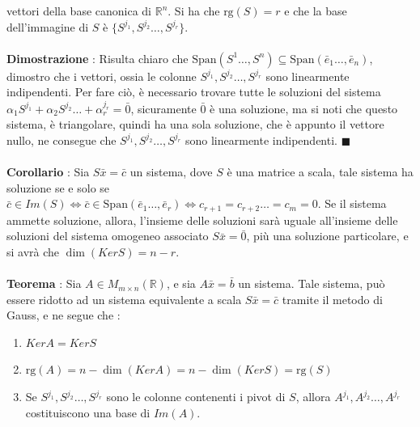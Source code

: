 \documentclass[12pt, letterpaper]{article}
\newcommand{\R}{{\mathbb R}}
\newcommand{\rg}{{\text{rg}}}
\newcommand{\acc}{\\\hphantom{}\\}
\newcommand{\Span}{{\text{Span}}}
\begin{document}
vettori della base canonica di \(\R^n\). Si ha che \(\rg(S)=r\) e che la base dell'immagine di \(S\) è \(\{S^{j_1},S^{j_2}\dots,S^{j_r}\}\).\acc 
\textbf{Dimostrazione} : Risulta chiaro che \(\Span(S^1\dots,S^n)\subseteq \Span(\bar e_1\dots,\bar e_n)\), dimostro che 
i vettori, ossia le colonne \(S^{j_1},S^{j_2}\dots,S^{j_r}\) sono linearmente indipendenti. Per fare ciò, è necessario trovare tutte 
le soluzioni del sistema  \(\alpha_1S^{j_1}+\alpha_2S^{j_2}\dots+\alpha_r^{j_r}=\bar 0\), sicuramente \(\bar 0\) è una soluzione, 
ma si noti che questo sistema, è triangolare, quindi ha una sola soluzione, che è appunto il vettore nullo, ne consegue che 
\(S^{j_1},S^{j_2}\dots,S^{j_r}\) sono linearmente indipendenti. \(\blacksquare\)\acc 
\textbf{Corollario} : Sia \(S\bar x=\bar c\) un sistema, dove \(S\) è una matrice a scala, tale sistema ha soluzione 
se e solo se \(\bar c \in Im(S)\iff \bar c \in \Span(\bar e_1\dots,\bar e_r)\iff c_{r+1}=c_{r+2}\dots = c_m=0\).
Se il sistema ammette soluzione, allora, l'insieme delle soluzioni sarà uguale all'insieme delle soluzioni 
del sistema omogeneo associato \(S\bar x=\bar0\), più una soluzione particolare, e si avrà che \(\dim(KerS)=n-r\).\acc 
\textbf{Teorema} : Sia \(A\in M_{m\times n}(\R)\), e sia \(A\bar x = \bar b\) un sistema. Tale sistema, può essere ridotto 
ad un sistema equivalente a scala \(S\bar x = \bar c\) tramite il metodo di Gauss, e ne segue che : \begin{enumerate}
    \item \(KerA=KerS\) 
    \item \(\rg(A)=n-\dim(KerA)=n-\dim(KerS)=\rg(S)\) 
    \item Se \(S^{j_1},S^{j_2}\dots,S^{j_r}\) sono le colonne contenenti i pivot di \(S\), allora 
    \(A^{j_1},A^{j_2}\dots,A^{j_r}\) costituiscono una base di \(Im(A)\).
\end{enumerate}
\end{document}
